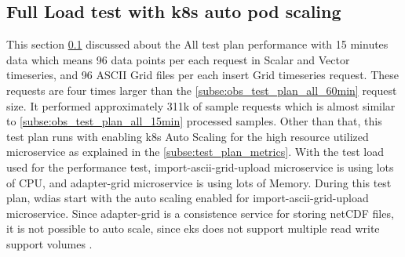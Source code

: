 \subsection{Full Load test with \acrfull{k8s} auto pod scaling}
\label{subse:obs_test_plan_all_auto_15min}
This section \ref{subse:obs_test_plan_all_auto_15min} discussed about the All test plan performance with 15 minutes data which means 96 data points per each request in Scalar and Vector timeseries, and 96 ASCII Grid files per each insert Grid timeseries request. These requests are four times larger than the \ref{subse:obs_test_plan_all_60min} request size. It performed approximately 311k of sample requests which is almost similar to \ref{subse:obs_test_plan_all_15min} processed samples.
Other than that, this test plan runs with enabling \acrshort{k8s} Auto Scaling for the high resource utilized microservice as explained in the \ref{subse:test_plan_metrics}. With the test load used for the performance test, import-ascii-grid-upload microservice is using lots of CPU, and adapter-grid microservice is using lots of Memory. During this test plan, \acrshort{wdias} start with the auto scaling enabled for import-ascii-grid-upload microservice. Since adapter-grid is a consistence service for storing netCDF files, it is not possible to auto scale, since \acrshort{eks} does not support multiple read write support volumes \cite{LinuxFoundationPersistentKubernetes}.

